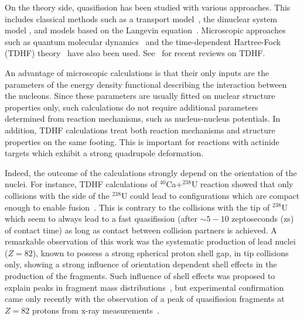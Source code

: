 On the theory side, quasifission has been studied with various approaches.
This includes classical methods such as
a transport model~\citep{diaz-torres2001}, the dinuclear system model \citep{adamian2003,huang2010,bao2015,guo2018c}, and models based on the Langevin equation~\citep{zagrebaev2005,aritomo2009,aritomo2012,karpov2017,sekizawa2019b}.
Microscopic approaches such as quantum molecular dynamics~\citep{wen2013,wang2016,zhao2016} and the
time-dependent Hartree-Fock (TDHF) theory~\citep{golabek2009,kedziora2010,wakhle2014,oberacker2014,hammerton2015,umar2015a,umar2016,sekizawa2016,yu2017,ayik2017,ayik2018,sekizawa2017a,wakhle2018,morjean2017,sekizawa2019b} have also been used. See~\citep{simenel2012,simenel2018,sekizawa2019,stevenson2019} for recent reviews on TDHF.

An advantage of microscopic calculations is that their only inputs are the parameters of the energy density functional describing the interaction between the nucleons.
Since these parameters are usually fitted on nuclear structure properties only, such calculations do not require additional parameters determined from reaction mechanisms, such as nucleus-nucleus potentials.
In addition, TDHF calculations treat both reaction mechanisms and structure properties on the same footing.
This is important for reactions with actinide targets which exhibit a strong quadrupole deformation.

Indeed, the outcome of the calculations strongly depend on the orientation of the nuclei.
For instance, TDHF calculations of $^{40}$Ca$+^{238}$U reaction showed that only collisions with the side of the $^{238}$U could lead to configurations which are compact enough to enable fusion~\citep{wakhle2014}.
This is contrary to the collisions with the tip of $^{238}$U which seem to always lead to a fast quasifission (after $\sim5-10$ zeptoseconds (zs) of contact time) as long as contact between collision partners is achieved.
A remarkable observation of this work was the systematic production of lead nuclei ($Z=82$), known to possess a strong spherical proton shell gap, in tip collisions only, showing a strong influence of orientation dependent shell effects in the production of the fragments.
Such influence of shell effects was proposed to explain peaks in fragment mass distributions~\citep{itkis2004,nishio2008,wakhle2014}, but experimental confirmation came only recently with the observation of a peak of quasifission fragments at $Z=82$ protons from x-ray measurements~\citep{morjean2017}.

